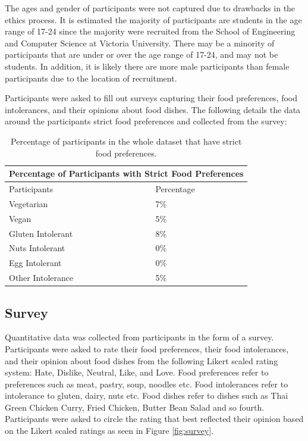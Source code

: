The ages and gender of participants were not captured due to drawbacks in the ethics process. It is estimated the majority of participants are students in the age range of 17-24 since the majority were recruited from the School of Engineering and Computer Science at Victoria University. There may be a minority of participants that are under or over the age range of 17-24, and may not be students. In addition, it is likely there are more male participants than female participants due to the location of recruitment.

Participants were asked to fill out surveys capturing their food preferences, food intolerances, and their opinions about food dishes. The following details the data around the participants strict food preferences and collected from the survey:

\begin{table}[h!]
\centering
\begin{tabular}{|l|l|} 
 \hline
 \multicolumn{2}{|c|}{Percentage of Participants with Strict Food Preferences} \\
    \hline
    \hline
    Participants & Percentage \\
     \hline\hline
     Vegetarian & 7\%\\ [0.5ex] 
     \hline
     Vegan & 5\% \\
     \hline
     Gluten Intolerant & 8\% \\
     \hline
     Nuts Intolerant & 0\% \\
     \hline
     Egg Intolerant & 0\% \\
     \hline
     Other Intolerance & 5\% \\
     \hline
\end{tabular}
\caption{Percentage of participants in the whole dataset that have strict food preferences.}
\label{table:food_participants}
\end{table}

\subsection{Survey}

Quantitative data was collected from participants in the form of a survey. Participants were asked to rate their food preferences, their food intolerances, and their opinion about food dishes from the following Likert scaled rating system: Hate, Dislike, Neutral, Like, and Love. Food preferences refer to preferences such as meat, pastry, soup, noodles etc. Food intolerances refer to intolerance to gluten, dairy, nuts etc. Food dishes refer to dishes such as Thai Green Chicken Curry, Fried Chicken, Butter Bean Salad and so fourth. Participants were asked to circle the rating that best reflected their opinion based on the Likert scaled ratings as seen in Figure \ref{fig:survey}. 

